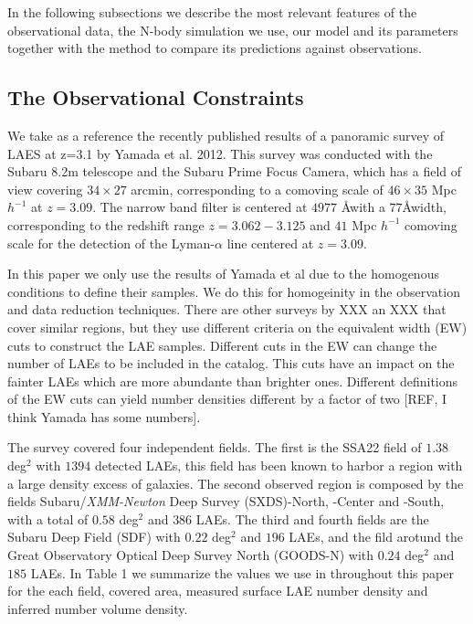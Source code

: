 \documentclass{emulateapj}
\begin{document}
In the following subsections we describe the most relevant features of the observational data, the N-body simulation we use, our model and its parameters together with the method to compare its predictions against observations.

\subsection{The Observational Constraints}
We take as a reference the recently published results of a panoramic survey of LAES at z=3.1 by Yamada et al. 2012. This survey was conducted with the Subaru 8.2m telescope and the Subaru Prime Focus Camera, which has a field of view covering $34\times 27$ arcmin, corresponding to a comoving scale of $46\times35$ Mpc $h^{-1}$ at $z=3.09$. The narrow band filter is centered at $4977$ \AA with a $77$\AA width, corresponding to the redshift range $z=3.062-3.125$ and $41$ Mpc $h^{-1}$ comoving scale for the detection of the Lyman-$\alpha$ line centered at $z=3.09$.

In this paper we only use the results of Yamada et al due to the homogenous conditions  to define their samples. We do this for homogeinity in the observation and data reduction techniques. There are other surveys by XXX an XXX that cover similar regions, but they use different criteria on the equivalent width (EW) cuts to construct the LAE samples. Different cuts in the EW can change the number of LAEs to be included in the catalog. This cuts have an impact on the fainter LAEs which are more abundante than brighter ones. Different definitions of the EW cuts can yield number densities different by a factor of two [REF, I think Yamada has some numbers].


The survey covered four independent fields. The first is the SSA22 field of $1.38$ deg$^2$ with $1394$ detected LAEs, this field has been known to harbor a region with a large density excess of galaxies. The second observed region is composed by the fields Subaru/{\it XMM-Newton} Deep Survey (SXDS)-North, -Center and -South, with a total of $0.58$ deg$^2$ and $386$ LAEs. The third and fourth fields are the Subaru Deep Field (SDF) with $0.22$ deg$^2$ and $196$ LAEs, and the fild arotund the Great Observatory Optical Deep Survey North (GOODS-N) with $0.24$ deg$^2$ and $185$ LAEs. In Table 1 we summarize the values we use in throughout this paper for the each field, covered area, measured surface LAE number density and inferred number volume density.
\end{document}
